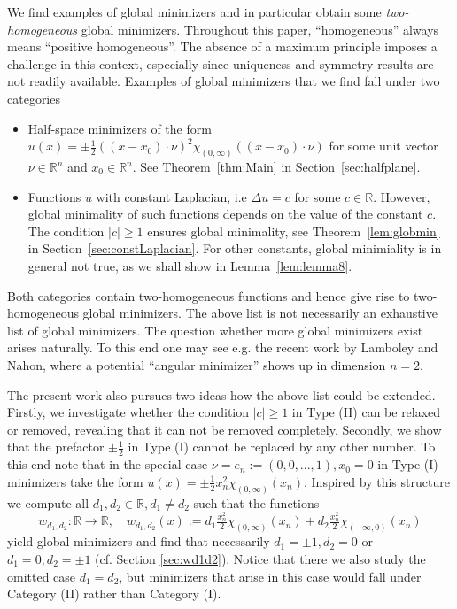 \documentclass[twoside,11pt]{article}
\theoremstyle{definition}
\begin{document}
We find examples of global minimizers and in particular obtain some 
\emph{two-homogeneous} global 
minimizers. 
Throughout this paper, ``homogeneous'' always means ``positive homogeneous''.
The absence of a maximum principle imposes a challenge in this context, especially since uniqueness and symmetry results are not readily available. Examples of global minimizers that we find fall under two categories
\begin{itemize}
    \item[(I)] Half-space minimizers of the form $u(x) = \pm \frac{1}{2}((x-x_0) \cdot \nu)^2 \chi_{(0,\infty)}((x-x_0) \cdot \nu)$ for some unit vector $\nu \in \mathbb{R}^n$ and $x_0 \in \mathbb{R}^n$.
    See Theorem~\ref{thm:Main} in Section~\ref{sec:halfplane}. 
    \item[(II)] Functions $u$ with constant Laplacian, i.e $\Delta u= c$ for some $c \in \mathbb{R}$. However, global minimality of such functions depends on the value of the constant $c$. The condition $|c| \geq 1$ ensures global minimality, see Theorem~\ref{lem:globmin} in Section~\ref{sec:constLaplacian}.  
    For other constants, global minimiality is in general not  
    true, as we shall show in Lemma~\ref{lem:lemma8}. 
\end{itemize}
Both categories contain two-homogeneous functions and hence give rise to two-homogeneous global minimizers. The above list is not necessarily an exhaustive list of global minimizers. The question whether more global minimizers exist arises naturally. To this end one may see e.g. the recent work \cite{Nahon} by Lamboley and Nahon, where a potential ``angular minimizer'' shows up in dimension $n=2$.
	

	The present work also pursues two ideas how the above list could be extended. Firstly, we investigate whether the condition $|c| \geq 1$ in Type (II) can be relaxed or removed, revealing that it can not be removed completely. Secondly, we show that the prefactor  $\pm \frac{1}{2}$ in Type (I) cannot be replaced by any other number. To this end note that in the special case $\nu= e_n := (0,0,...,1), x_0=0$ in Type-(I) minimizers take the form $u(x)= \pm \frac{1}{2} x_n^2 \chi_{(0,\infty)}(x_n)$. Inspired by this structure we compute all $d_1,d_2 \in \mathbb{R},d_1\neq d_2$ such that the functions 
\begin{equation}\label{eq:2A}
    w_{d_1,d_2}: \mathbb{R} \to \mathbb{R}, \quad w_{d_1,d_2}(x) :=d_1 \tfrac{x_n^2}{2} \chi_{(0,\infty)}(x_n) + d_2 \tfrac{x_n^2}{2} \chi_{(-\infty,0)}(x_n)
\end{equation}
yield global minimizers and find that necessarily $d_1= \pm 1,d_2=0$ or $d_1=0,d_2= \pm1$ (cf. Section \ref{sec:wd1d2}). Notice that there we also study the omitted case $d_1=d_2$, but minimizers that arise in this case would fall under Category (II) rather than Category (I). 
\end{document}
